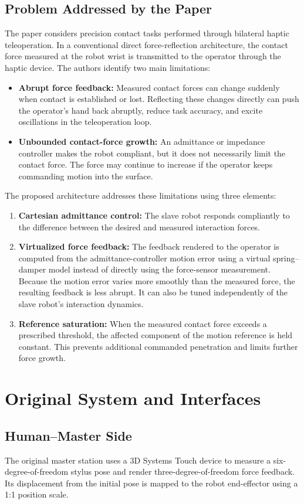 \documentclass[journal]{IEEEtran}
\begin{document}
\subsection{Problem Addressed by the Paper}
The paper considers precision contact tasks performed through bilateral haptic teleoperation. In a conventional direct force-reflection architecture, the contact force measured at the robot wrist is transmitted to the operator through the haptic device. The authors identify two main limitations:
\begin{itemize}
\item \textbf{Abrupt force feedback:} Measured contact forces can change suddenly when contact is established or lost. Reflecting these changes directly can push the operator's hand back abruptly, reduce task accuracy, and excite oscillations in the teleoperation loop.
\item \textbf{Unbounded contact-force growth:} An admittance or impedance controller makes the robot compliant, but it does not necessarily limit the contact force. The force may continue to increase if the operator keeps commanding motion into the surface.
\end{itemize}
The proposed architecture addresses these limitations using three elements:
\begin{enumerate}
\item \textbf{Cartesian admittance control:} The slave robot responds compliantly to the difference between the desired and measured interaction forces.
\item \textbf{Virtualized force feedback:} The feedback rendered to the operator is computed from the admittance-controller motion error using a virtual spring--damper model instead of directly using the force-sensor measurement. Because the motion error varies more smoothly than the measured force, the resulting feedback is less abrupt. It can also be tuned independently of the slave robot's interaction dynamics.
\item \textbf{Reference saturation:} When the measured contact force exceeds a prescribed threshold, the affected component of the motion reference is held constant. This prevents additional commanded penetration and limits further force growth.
\end{enumerate}

\section{Original System and Interfaces}
\subsection{Human--Master Side}
The original master station uses a 3D Systems Touch device to measure a six-degree-of-freedom stylus pose and render three-degree-of-freedom force feedback. Its displacement from the initial pose is mapped to the robot end-effector using a 1:1 position scale.
\end{document}
